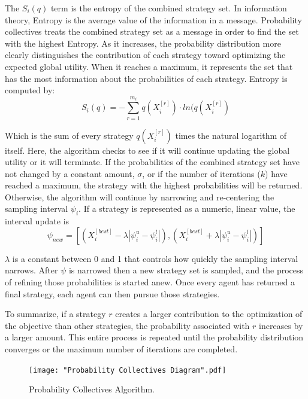 \documentclass{sig-alternate}
\begin{document}
The $S_i(q)$ term is the entropy of the combined strategy set. In information theory, Entropy is the average value of the information in a message. Probability collectives treats the combined strategy set as a message in order to find the set with the highest Entropy. As it increases, the probability distribution more clearly distinguishes the contribution of each strategy toward optimizing the expected global utility. When it reaches a maximum, it represents the set that has the most information about the probabilities of each strategy. Entropy is computed by:
	\begin{equation}
	S_i(q)=-\sum_{r=1}^{m_i}q(X_i^{[r]})\cdot ln(q(X_i^{[r]})
	\end{equation}
	
Which is the sum of every strategy $q(X_i^{[r]})$ times the natural logarithm of itself. Here, the algorithm checks to see if it will continue updating the global utility or it will terminate. If the probabilities of the combined strategy set have not changed by a constant amount, $\sigma$, or if the number of iterations ($k$) have reached a maximum, the strategy with the highest probabilities will be returned. Otherwise, the algorithm will continue by narrowing and re-centering the sampling interval $\psi_i$. If a strategy is represented as a numeric, linear value, the interval update is 
	\begin{equation}
	\psi_{new} = [(X_i^{[best]}-\lambda|\psi_i^u - \psi_i^l|),(X_i^{[best]}+\lambda|\psi_i^u - \psi_i^l|)]
	\end{equation}

$\lambda$ is a constant between 0 and 1 that controls how quickly the sampling interval narrows. After $\psi$ is narrowed then a new strategy set is sampled, and the process of refining those probabilities is started anew. Once every agent has returned a final strategy, each agent can then pursue those strategies.

To summarize, if a strategy $r$ creates a larger contribution to the optimization of the objective than other strategies, the probability associated with $r$ increases by a larger amount. This entire process is repeated until the probability distribution converges or the maximum number of iterations are completed. 

\begin{figure}
\centering
\texttt{[image: "Probability Collectives Diagram".pdf]}
\caption{Probability Collectives Algorithm.}
\label{fig:PCDiagram}
\end{figure}
\end{document}
